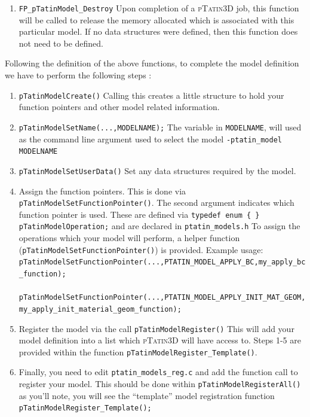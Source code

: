 \documentclass[paper=a4, fontsize=10pt,twoside]{scrartcl}
\newcommand{\ptat}{{{\textsc{pTatin3D}}}}
\newcommand{\shellcmd}[1]{\\\indent\indent\texttt{\hspace{5mm}\footnotesize #1}\\}
\newcommand{\unix}[1]{\texttt{\footnotesize #1}}
\begin{document}
{{\begin{enumerate}
	\item \unix{FP\_pTatinModel\_Destroy} 
	Upon completion of a {\ptat} job, this function will be called to release the memory allocated which is associated 
	with this particular model. If no data structures were defined, then this function does not need to be defined.
\end{enumerate}

Following the definition of the above functions, to complete the model definition we have to perform the following steps :
\begin{enumerate}
	\item \unix{pTatinModelCreate()}
Calling this creates a little structure to hold your function pointers and other model related information.

	\item \unix{pTatinModelSetName(...,MODELNAME);}
The variable in \unix{MODELNAME}, will used as the command line argument used to select the model
	\unix{-ptatin\_model MODELNAME}

	\item \unix{pTatinModelSetUserData()}
Set any data structures required by the model.

	\item Assign the function pointers. This is done via \unix{pTatinModelSetFunctionPointer()}.
The second argument indicates which function pointer is used. These are defined via
\unix{typedef enum \{ \} pTatinModelOperation;}
and are declared in 
\unix{ptatin\_models.h}
To assign the operations which your model will perform, a helper function (\unix{pTatinModelSetFunctionPointer()}) is provided.
Example usage:
\shellcmd{pTatinModelSetFunctionPointer(...,PTATIN\_MODEL\_APPLY\_BC,my\_apply\_bc\_function);}
\shellcmd{pTatinModelSetFunctionPointer(...,PTATIN\_MODEL\_APPLY\_INIT\_MAT\_GEOM,my\_apply\_init\_material\_geom\_function);} %

	\item Register the model via the call
\unix{pTatinModelRegister()}
This will add your model definition into a list which {\ptat} will have access to.
Steps 1-5 are provided within the function \unix{pTatinModelRegister\_Template()}.

	\item Finally, you need to edit
	\unix{ptatin\_models\_reg.c}
and add the function call to register your model.
This should be done within
		\unix{pTatinModelRegisterAll()}
as you'll note, you will see the ``template'' model registration function 	
		\unix{pTatinModelRegister\_Template();}


\end{enumerate}}}
\end{document}
